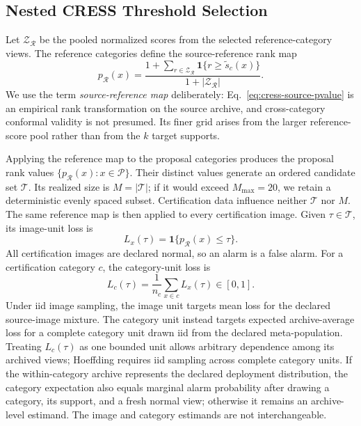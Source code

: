 \subsection{Nested CRESS Threshold Selection}\label{sec:cress-threshold-selection}
Let $\mathcal{Z}_{\mathcal{R}}$ be the pooled normalized scores from the selected reference-category views. The reference categories define the source-reference rank map
\begin{equation}\label{eq:cress-source-pvalue}
    p_{\mathcal{R}}(x)
    =\frac{1+\sum_{r\in\mathcal{Z}_{\mathcal{R}}}
    \mathbf{1}\{r\geq\widetilde{s}_c(x)\}}
    {1+|\mathcal{Z}_{\mathcal{R}}|}.
\end{equation}
We use the term \emph{source-reference map} deliberately: Eq.~\eqref{eq:cress-source-pvalue} is an empirical rank transformation on the source archive, and cross-category conformal validity is not presumed. Its finer grid arises from the larger reference-score pool rather than from the $k$ target supports.

Applying the reference map to the proposal categories produces the proposal rank values $\{p_{\mathcal R}(x):x\in\mathcal P\}$. Their distinct values generate an ordered candidate set $\mathcal{T}$. Its realized size is $M=|\mathcal T|$; if it would exceed $M_{\max}=20$, we retain a deterministic evenly spaced subset. Certification data influence neither $\mathcal T$ nor $M$. The same reference map is then applied to every certification image. Given $\tau\in\mathcal T$, its image-unit loss is
\begin{equation}\label{eq:cress-image-loss}
    L_x(\tau)=\mathbf{1}\{p_{\mathcal{R}}(x)\leq\tau\}.
\end{equation}
All certification images are declared normal, so an alarm is a false alarm. For a certification category $c$, the category-unit loss is
\begin{equation}\label{eq:cress-category-loss}
    L_c(\tau)=\frac{1}{n_c}\sum_{x\in c}L_x(\tau)\in[0,1].
\end{equation}
Under iid image sampling, the image unit targets mean loss for the declared source-image mixture. The category unit instead targets expected archive-average loss for a complete category unit drawn iid from the declared meta-population. Treating $L_c(\tau)$ as one bounded unit allows arbitrary dependence among its archived views; Hoeffding requires iid sampling across complete category units. If the within-category archive represents the declared deployment distribution, the category expectation also equals marginal alarm probability after drawing a category, its support, and a fresh normal view; otherwise it remains an archive-level estimand. The image and category estimands are not interchangeable.

